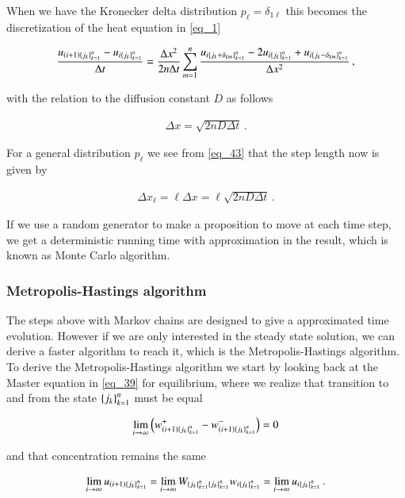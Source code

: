 \documentclass[11pt,english,a4paper]{article}
\begin{document}
\begin{flushleft}
When we have the Kronecker delta distribution $p_\ell = \delta_{1\ell}$ this becomes the discretization of the heat equation in \eqref{eq_1} 

\begin{align*}
\frac{u_{(i+1)\left\lbrace{j_k}\right\rbrace_{k=1}^n}-u_{i\left\lbrace{j_k}\right\rbrace_{k=1}^n}}{\Delta t} = \frac{\Delta x^2}{2n\Delta t}\sum_{m=1}^n\frac{u_{i\left\lbrace{j_k+\delta_{km}}\right\rbrace_{k=1}^n} - 2 u_{i\left\lbrace{j_k}\right\rbrace_{k=1}^n} + u_{i\left\lbrace{j_k-\delta_{km}}\right\rbrace_{k=1}^n}}{\Delta x^2} \,,
\end{align*}

with the relation to the diffusion constant $D$ as follows

\begin{align}
\Delta x = \sqrt{2nD\Delta t}\,. 
\label{eq_44}
\end{align}

For a general distribution $p_\ell$ we see from \eqref{eq_43} that the step length now is given by

\begin{align}
\Delta x_\ell = \ell \Delta x = \ell\sqrt{2nD\Delta t}\,.
\label{eq_45}
\end{align} 

If we use a random generator to make a proposition to move at each time step, we get a deterministic running time with approximation in the result, which is known as Monte Carlo algorithm. 

\subsubsection{Metropolis-Hastings algorithm}

The steps above with Markov chains are designed to give a approximated time evolution. However if we are only interested in the steady state solution, we can derive a faster algorithm to reach it, which is the Metropolis-Hastings algorithm. To derive the Metropolis-Hastings algorithm we start by looking back at the Master equation in \eqref{eq_39} for equilibrium, where we realize that transition to and from the state $\left\lbrace{j_k}\right\rbrace_{k=1}^n$ must be equal

\begin{align*}
\lim_{i\to \infty} \left({w_{(i+1)\left\lbrace{j_k}\right\rbrace_{k=1}^n}^+ - w_{(i+1)\left\lbrace{j_k}\right\rbrace_{k=1}^n}^-}\right) = 0
\end{align*}

and that concentration remains the same

\begin{align*}
\lim_{i\to \infty} u_{(i+1)\left\lbrace{j_k}\right\rbrace_{k=1}^n} = \lim_{i\to \infty} W_{\left\lbrace{j_k}\right\rbrace_{k=1}^n\left\lbrace{j_k}\right\rbrace_{k=1}^n} w_{i\left\lbrace{j_k}\right\rbrace_{k=1}^n} = \lim_{i\to\infty} u_{i\left\lbrace{j_k}\right\rbrace_{k=1}^n} \,.
\end{align*}


\end{flushleft}
\end{document}
